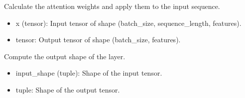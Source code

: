 \documentclass[letterpaper,10pt,english]{sphinxmanual}
\begin{document}
\begin{fulllineitems}
\begin{fulllineitems}
\label{\detokenize{network_watcher:network_watcher.AttentionLayer.call}}
\pysigstartsignatures
{}
\pysigstopsignatures
\sphinxAtStartPar
Calculate the attention weights and apply them to the input sequence.
\begin{description}
\begin{itemize}
\item {} 
\sphinxAtStartPar
x (tensor): Input tensor of shape (batch\_size, sequence\_length, features).

\end{itemize}

\begin{itemize}
\item {} 
\sphinxAtStartPar
tensor: Output tensor of shape (batch\_size, features).

\end{itemize}

\end{description}

\end{fulllineitems}


\begin{fulllineitems}
\label{\detokenize{network_watcher:network_watcher.AttentionLayer.compute_output_shape}}
\pysigstartsignatures
{}
\pysigstopsignatures
\sphinxAtStartPar
Compute the output shape of the layer.
\begin{description}
\begin{itemize}
\item {} 
\sphinxAtStartPar
input\_shape (tuple): Shape of the input tensor.

\end{itemize}

\begin{itemize}
\item {} 
\sphinxAtStartPar
tuple: Shape of the output tensor.

\end{itemize}

\end{description}

\end{fulllineitems}


\end{fulllineitems}
\end{document}
